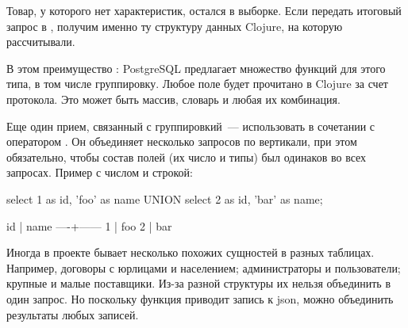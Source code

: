 
Товар, у которого нет характеристик, остался в выборке. Если передать итоговый запрос в , получим именно ту структуру данных Clojure, на которую рассчитывали.

В этом преимущество : PostgreSQL предлагает множество функций для этого типа, в том числе группировку. Любое поле  будет прочитано в Clojure за счет протокола. Это может быть массив, словарь и любая их комбинация.

Еще один прием, связанный с группировкий~--- использовать  в сочетании с оператором . Он объединяет несколько запросов по вертикали, при этом обязательно, чтобы состав полей (их число и типы) был одинаков во всех запросах. Пример с числом и строкой:

\begin{english}
  \begin{sql}
select 1 as id, 'foo' as name
UNION
select 2 as id, 'bar' as name;
  \end{sql}
\end{english}


\begin{english}
  \begin{text}
 id | name
----+------
  1 | foo
  2 | bar
  \end{text}
\end{english}

Иногда в проекте бывает несколько похожих сущностей в разных таблицах. Например, договоры с юрлицами и населением; администраторы и пользователи; крупные и малые поставщики. Из-за разной структуры их нельзя объединить в один запрос. Но поскольку функция  приводит запись к json, можно объединить результаты любых записей.

